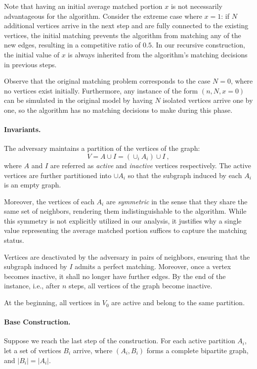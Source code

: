 \documentclass[11pt,letterpaper]{article}
\begin{document}
Note that having an initial average matched portion $x$ is not necessarily advantageous for the algorithm. Consider the extreme case where $x = 1$: if $N$ additional vertices arrive in the next step and are fully connected to the existing vertices, the initial matching prevents the algorithm from matching any of the new edges, resulting in a competitive ratio of $0.5$. In our recursive construction, the initial value of $x$ is always inherited from the algorithm’s matching decisions in previous steps.

Observe that the original matching problem corresponds to the case $N = 0$, where no vertices exist initially. Furthermore, any instance of the form $(n, N, x = 0)$ can be simulated in the original model by having $N$ isolated vertices arrive one by one, so the algorithm has no matching decisions to make during this phase.


\paragraph{Invariants.}
The adversary maintains a partition of the vertices of the graph:
\[
V = A \cup I = \left(\cup_{i} A_i \right) \cup I~,
\]
where $A$ and $I$ are referred as \emph{active} and \emph{inactive} vertices respectively.  
The active vertices are further partitioned into $\cup A_i$ so that the subgraph induced by each $A_i$ is an empty graph. 

Moreover, the vertices of each $A_i$ are \emph{symmetric} in the sense that they share the same set of neighbors, rendering them indistinguishable to the algorithm. While this symmetry is not explicitly utilized in our analysis, it justifies why a single value representing the average matched portion suffices to capture the matching status.


Vertices are deactivated by the adversary in pairs of neighbors, ensuring that the subgraph induced by $I$ admits a perfect matching. Moreover, once a vertex becomes inactive, it shall no longer have further edges. By the end of the instance, i.e., after $n$ steps, all vertices of the graph become inactive.

At the beginning, all vertices in $V_0$ are active and belong to the same partition. 

\paragraph{Base Construction.} Suppose we reach the last step of the construction. For each active partition $A_i$, let a set of vertices $B_i$ arrive, where $(A_i,B_i)$ forms a complete bipartite graph, and $|B_i|=|A_i|$. 
\end{document}
